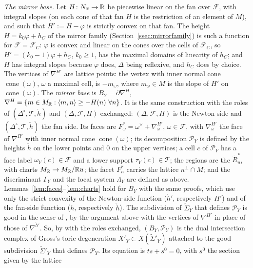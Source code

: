 \emph{The mirror base.} Let $H\colon N_\mathbb R\to\mathbb R$ be piecewise linear on the fan over $\mathcal F$, with integral slopes (on
each cone of that fan $H$ is the restriction of an element of $M$), and such that $H':=H-\varphi$ is strictly convex on
that fan. The height $H=k_0\varphi+h_C$ of the mirror family (Section~\ref{ssec:mirrorfamily}) is such a function for
$\mathcal F=\mathcal F_C$: $\varphi$ is convex and linear on the cones over the cells of $\mathcal F_C$, so
$H'=(k_0-1)\varphi+h_C$, $k_0\ge1$, has the maximal domains of linearity of $h_C$; and $H$ has integral slopes because
$\varphi$ does, $\Delta$ being reflexive, and $h_C$ does by choice. The vertices of $\nabla^{H'}$ are lattice points: the
vertex with inner normal cone $\operatorname{cone}(\omega)$, $\omega$ a maximal cell, is $-m_\omega$, where $m_\omega\in M$
is the slope of $H'$ on $\operatorname{cone}(\omega)$. The \emph{mirror base} is $B_Y=\partial\nabla^H$,
$\nabla^H=\{m\in M_\mathbb R:\langle m,n\rangle\ge-H(n)\ \forall n\}$. It is the same construction with the roles of
$(\Delta^\circ,\mathcal T,\check h)$ and $(\Delta,\mathcal F,H)$ exchanged: $(\Delta,\mathcal F,H)$ is the Newton side and
$(\Delta^\circ,\mathcal T,\check h)$ the fan side. Its faces are $F^*_\omega=\omega^\vee+\nabla^{H'}_\omega$,
$\omega\in\mathcal F$, with $\nabla^{H'}_\omega$ the face of $\nabla^{H'}$ with inner normal cone
$\operatorname{cone}(\omega)$; its decomposition $\mathscr P_Y$ is defined by the heights $\check h$ on the lower points and
$0$ on the upper vertices; a cell $c$ of $\mathscr P_Y$ has a face label $\omega_Y(c)\in\mathcal F$ and a lower support
$\tau_Y(c)\in\mathcal T$; the regions are the $\widetilde R^*_u$, with charts $M_\mathbb R\to M_\mathbb R/\mathbb R u$; the facet $F^*_n$ carries
the lattice $n^\perp\cap M$; and the discriminant $\Gamma_Y$ and the local system $\Lambda_Y$ are defined as above.
Lemmas~\ref{lem:faces}--\ref{lem:charts} hold for $B_Y$ with the same proofs, which use only the strict convexity of the
Newton-side function ($\check h'$, respectively $H'$) and of the fan-side function ($h$, respectively $\check h$). The
subdivision of $\widetilde\Sigma_Y$ that defines $\mathscr P_Y$ is good in the sense of \cite[Def.~3.8]{Gross2005}, by the
argument above with the vertices of $\nabla^{H'}$ in place of those of $\nabla^{\check h'}$. So, by
\cite[Prop.~3.14]{Gross2005} with the roles exchanged, $(B_Y,\mathscr P_Y)$ is the dual intersection complex of Gross's toric
degeneration $X'_Y\subset X(\widetilde\Sigma'_Y)$ \cite[Thm.~3.10]{Gross2005} attached to the good subdivision
$\widetilde\Sigma'_Y$ that defines $\mathscr P_Y$. Its equation is $ts+s^0=0$, with $s^0$ the section given by the lattice
